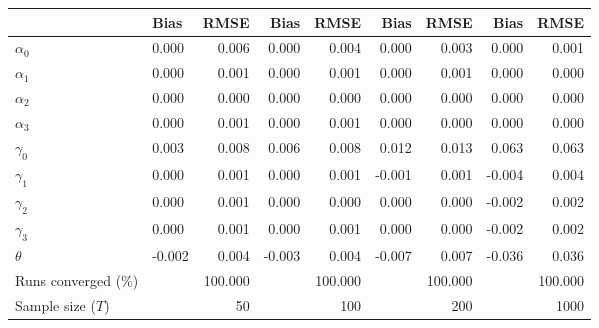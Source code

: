 
\begin{tabular}[t]{llrrrrrrr}
\toprule
  & Bias & RMSE & Bias & RMSE & Bias & RMSE & Bias & RMSE\\
\midrule
$\alpha_{0}$ & 0.000 & 0.006 & 0.000 & 0.004 & 0.000 & 0.003 & 0.000 & 0.001\\
$\alpha_{1}$ & 0.000 & 0.001 & 0.000 & 0.001 & 0.000 & 0.001 & 0.000 & 0.000\\
$\alpha_{2}$ & 0.000 & 0.000 & 0.000 & 0.000 & 0.000 & 0.000 & 0.000 & 0.000\\
$\alpha_{3}$ & 0.000 & 0.001 & 0.000 & 0.001 & 0.000 & 0.000 & 0.000 & 0.000\\
$\gamma_{0}$ & 0.003 & 0.008 & 0.006 & 0.008 & 0.012 & 0.013 & 0.063 & 0.063\\
$\gamma_{1}$ & 0.000 & 0.001 & 0.000 & 0.001 & -0.001 & 0.001 & -0.004 & 0.004\\
$\gamma_{2}$ & 0.000 & 0.001 & 0.000 & 0.000 & 0.000 & 0.000 & -0.002 & 0.002\\
$\gamma_{3}$ & 0.000 & 0.001 & 0.000 & 0.001 & 0.000 & 0.000 & -0.002 & 0.002\\
$\theta$ & -0.002 & 0.004 & -0.003 & 0.004 & -0.007 & 0.007 & -0.036 & 0.036\\
Runs converged (\%) &  & 100.000 &  & 100.000 &  & 100.000 &  & 100.000\\
Sample size ($T$) &  & 50 &  & 100 &  & 200 &  & 1000\\
\bottomrule
\end{tabular}
